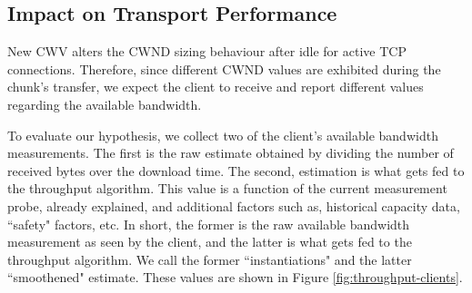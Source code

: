 \documentclass[10pt,sigconf]{acmart}
\begin{document}

\subsection{Impact on Transport Performance} 

New CWV alters the CWND sizing behaviour after idle for active TCP connections. Therefore, since different CWND values are exhibited during the chunk's transfer, we expect the client to receive and report different values regarding the available bandwidth. 

To evaluate our hypothesis, we collect two of the client's available bandwidth measurements. The first is the raw estimate obtained by dividing the number of received bytes over the download time. The second, estimation is what gets fed to the throughput algorithm. This value is a function of the current measurement probe, already explained, and additional factors such as, historical capacity data, ``safety" factors, etc. In short, the former is the raw available bandwidth measurement as seen by the client, and the latter is what gets fed to the throughput algorithm. We call the former ``instantiations" and the latter ``smoothened" estimate. These values are shown in Figure \ref{fig:throughput-clients}.
\end{document}
